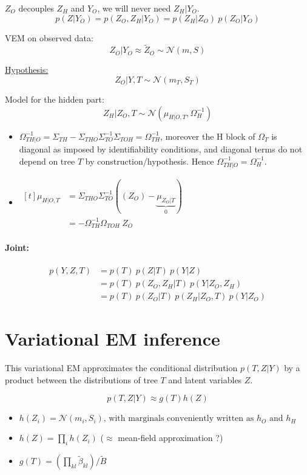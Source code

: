 \documentclass[11pt,a4paper]{article}
\begin{document}
$Z_O$ decouples $Z_H$ and $Y_O$, we will never need $Z_H|Y_O$.
$$ p(Z|Y_O) = p(Z_O,Z_H | Y_O) = p(Z_H|Z_O) \: p(Z_O|Y_O) $$


VEM on observed data: $$Z_O|Y_O \approx \widetilde{Z}_O \sim \mathcal{N}(m,S)$$

\underline{ Hypothesis:}
$$ Z_O|Y,T \sim \mathcal{N}(m_T,S_T)$$

Model for the hidden part: $$Z_H|Z_O,T \sim \mathcal{N}(\mu_{H|O,T}, \Omega_{H}^{-1})$$ 

\begin{itemize}
\item $\Omega_{TH|O}^{-1} = \Sigma_{TH} -\Sigma_{THO}\Sigma_{TO}^{-1}\Sigma_{TOH} = \Omega_{TH}^{-1}$, moreover the H block of $\Omega_T$ is diagonal as imposed by identifiability conditions, and diagonal terms do not depend on tree $T$  by construction/hypothesis. Hence $\Omega_{TH|O}^{-1}=\Omega_{H}^{-1}$.

\item$ \displaystyle\begin{aligned}[t]
\mu_{H|O,T} &= \Sigma_{THO}\Sigma_{TO}^{-1}((Z_O)-\underbrace{\mu_{Z_O|T}}_{0}) \\
 &= -\Omega_{TH}^{-1}\Omega_{TOH} \: Z_O
\end{aligned}$\\
\end{itemize}


\paragraph{Joint:}
\begin{align*}
p(Y,Z,T)& = p(T) \: p(Z|T) \: p(Y|Z) \\
&= p(T)\: p(Z_O,Z_H|T) \: p(Y|Z_O,Z_H) \\
&= p(T) \: p(Z_O|T) \: p(Z_H | Z_O,T)  \: p(Y|Z_O)
\end{align*} 
\section{Variational EM inference}

This variational EM approximates the conditional distribution $p(T,Z | Y)$ by a product  between the  distributions of tree $T$ and latent variables $Z$.

$$p(T,Z | Y) \approx  g(T)h(Z)$$
\begin{itemize}
\item $ h(Z_i) =  \mathcal{N}(m_i,S_i)\text{, with marginals conveniently written as } h_O \text{ and } h_H $
\item $ h(Z) = \prod_i h(Z_i)$ ($\approx$ mean-field approximation ?)
\item $ g(T) = \left(\prod_{kl} \widetilde{\beta}_{kl} \right) / \widetilde{B}$
\end{itemize}
\end{document}
